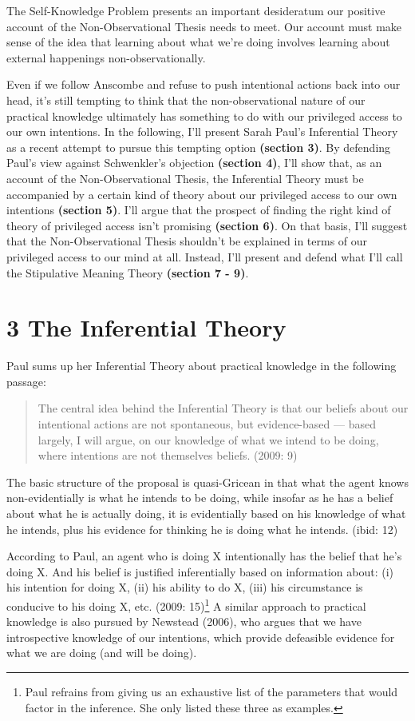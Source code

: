 \documentclass[a4paper,12pt]{article}
\begin{document}
The Self-Knowledge Problem presents an important desideratum our positive account of the Non-Observational Thesis needs to meet. Our account must make sense of the idea that learning about what we're doing involves learning about external happenings non-observationally.

Even if we follow Anscombe and refuse to push intentional actions back into our head, it's still tempting to think that the non-observational nature of our practical knowledge ultimately has something to do with our privileged access to our own intentions. In the following, I'll present Sarah Paul's Inferential Theory as a recent attempt to pursue this tempting option \textbf{(section 3)}. By defending Paul's view against Schwenkler's objection \textbf{(section 4)}, I'll show that, as an account of the Non-Observational Thesis, the Inferential Theory must be accompanied by a certain kind of theory about our privileged access to our own intentions \textbf{(section 5)}. I'll argue that the prospect of finding the right kind of theory of privileged access isn't promising \textbf{(section 6)}. On that basis, I'll suggest that the Non-Observational Thesis shouldn't be explained in terms of our privileged access to our mind at all. Instead, I'll present and defend what I'll call the Stipulative Meaning Theory \textbf{(section 7 - 9)}.

\section*{3 The Inferential Theory}
Paul sums up her Inferential Theory about practical knowledge in the following passage:

\begin{quote} The central idea behind the Inferential Theory is that our beliefs about our intentional actions are not spontaneous, but evidence-based --- based largely, I will argue, on our knowledge of what we intend to be doing, where intentions are not themselves beliefs. (2009: 9) \end{quote}

The basic structure of the proposal is quasi-Gricean in that what the agent knows non-evidentially is what he intends to be doing, while insofar as he has a belief about what he is actually doing, it is evidentially based on his knowledge of what he intends, plus his evidence for thinking he is doing what he intends. (ibid: 12)

According to Paul, an agent who is doing X intentionally has the belief that he's doing X. And his belief is justified inferentially based on information about: (i) his intention for doing X, (ii) his ability to do X, (iii) his circumstance is conducive to his doing X, etc. (2009: 15)\footnote{Paul refrains from giving us an exhaustive list of the parameters that would factor in the inference. She only listed these three as examples.} A similar approach to practical knowledge is also pursued by Newstead (2006), who argues that we have introspective knowledge of our intentions, which provide defeasible evidence for what we are doing (and will be doing).\footnotemark
\end{document}
